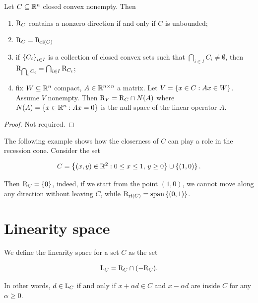 \begin{proposition}
    
    Let $C \subseteq {\mathbb{R}^n}$ closed convex nonempty. Then 

    \begin{enumerate}
        \item[a)] $\mathrm{R}_{C}$ contains a nonzero direction if and only if $C$ is unbounded;
        \item[b)] $\mathrm{R}_{C} = \mathrm{R}_{\mathrm{ri}\left(C\right)}$
        \item[c)] if $\left\{ C_i \right\}_{i \in I}$ is a collection of closed convex sets such that $\displaystyle\bigcap_{i \in I} C_i \neq \emptyset$, then $\mathrm{R}_{\bigcap_i C_i} = \bigcap_{i \in I} \mathrm{R}_{C_i}$;
        \item[d)] fix $W \subseteq {\mathbb{R}^n}$ compact, $A \in \mathbb{R}^{n\times n}$ a matrix. Let $V = \left\{ x \in C : Ax  \in W \right\}$. Assume $V$ nonempty. Then $\mathrm{R}_{V} = \mathrm{R}_{C} \cap N(A)$ where $N(A) = \left\{ x \in {\mathbb{R}^n} : Ax = 0 \right\}$ is the null space of the linear operator $A$.
    \end{enumerate}

\end{proposition}

\begin{proof}
    Not required.
\end{proof}

\begin{example}

    The following example shows how the closerness of $C$ can play a role in the recession cone. Consider the set 

    \[ C = \left\{ (x,y) \in \mathbb{R}^2 : 0 \le x \le 1,\, y \ge 0 \right\} \cup \left\{ (1,0) \right\}. \]

    Then $\mathrm{R}_{C} = \left\{ 0 \right\}$, indeed, if we start from the point $(1,0)$, we cannot move along any direction without leaving $C$, while $\mathrm{R}_{\mathrm{ri}\left(C\right)} = \mathrm{span}\left\{ (0,1) \right\}$. 
    
\end{example}

\section{Linearity space}

We define the linearity space for a set $C$ as the set 

\[ \mathrm{L}_{C} = \mathrm{R}_{C} \cap (-\mathrm{R}_{C}). \]

In other words, $d \in \mathrm{L}_{C}$ if and only if $x + \alpha d \in C$ and $x - \alpha d$ are inside $C$ for any $\alpha \ge 0$.

